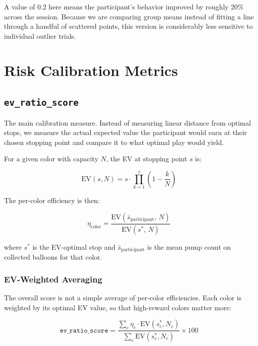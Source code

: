 \documentclass[11pt,a4paper]{article}
\begin{document}
A value of $0.2$ here means the participant's behavior improved by roughly
$20\%$ across the session. Because we are comparing group means instead of
fitting a line through a handful of scattered points, this version is
considerably less sensitive to individual outlier trials.


\section{Risk Calibration Metrics}

\subsection{\texttt{ev\_ratio\_score}}
\label{sec:ev_ratio}

The main calibration measure. Instead of measuring linear distance from
optimal stops, we measure the actual expected value the participant would
earn at their chosen stopping point and compare it to what optimal play
would yield.

For a given color with capacity $N$, the EV at stopping point $s$ is:

\begin{equation}
    \text{EV}(s, N) = s \cdot \prod_{k=1}^{s} \left(1 - \frac{k}{N}\right)
\end{equation}

The per-color efficiency is then:

\begin{equation}
    \eta_{\text{color}} = \frac{\text{EV}(\bar{s}_{\text{participant}},\, N)}
                               {\text{EV}(s^*,\, N)}
\end{equation}

where $s^*$ is the EV-optimal stop and $\bar{s}_{\text{participant}}$ is
the mean pump count on collected balloons for that color.

\subsubsection*{EV-Weighted Averaging}

The overall score is not a simple average of per-color efficiencies. Each
color is weighted by its optimal EV value, so that high-reward colors
matter more:

\begin{equation}
    \texttt{ev\_ratio\_score} = \frac{\sum_c \eta_c \cdot \text{EV}(s^*_c, N_c)}
                                     {\sum_c \text{EV}(s^*_c, N_c)} \times 100
\end{equation}
\end{document}
